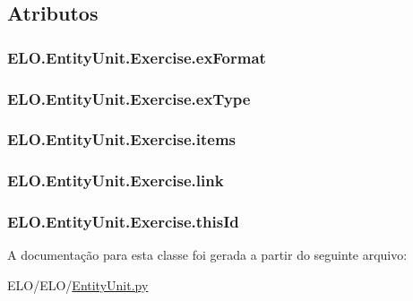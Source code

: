 \subsection{Atributos}
\hypertarget{classELO_1_1EntityUnit_1_1Exercise_a0d17db96aa0caa63df47795c50818e9f}{
\subsubsection[{ex\-Format}]{\setlength{\rightskip}{0pt plus 5cm}E\-L\-O.\-Entity\-Unit.\-Exercise.\-ex\-Format}}\label{classELO_1_1EntityUnit_1_1Exercise_a0d17db96aa0caa63df47795c50818e9f}
\hypertarget{classELO_1_1EntityUnit_1_1Exercise_af982926b59b32980803f93f40b383d77}{
\subsubsection[{ex\-Type}]{\setlength{\rightskip}{0pt plus 5cm}E\-L\-O.\-Entity\-Unit.\-Exercise.\-ex\-Type}}\label{classELO_1_1EntityUnit_1_1Exercise_af982926b59b32980803f93f40b383d77}
\hypertarget{classELO_1_1EntityUnit_1_1Exercise_a14ec766ff723672be49ea5c9438744c8}{
\subsubsection[{items}]{\setlength{\rightskip}{0pt plus 5cm}E\-L\-O.\-Entity\-Unit.\-Exercise.\-items}}\label{classELO_1_1EntityUnit_1_1Exercise_a14ec766ff723672be49ea5c9438744c8}
\hypertarget{classELO_1_1EntityUnit_1_1Exercise_a13a9382d9126f07ab380ea11df276ed8}{
\subsubsection[{link}]{\setlength{\rightskip}{0pt plus 5cm}E\-L\-O.\-Entity\-Unit.\-Exercise.\-link}}\label{classELO_1_1EntityUnit_1_1Exercise_a13a9382d9126f07ab380ea11df276ed8}
\hypertarget{classELO_1_1EntityUnit_1_1Exercise_a6277daccaa7fe96d8f0a287002cea07a}{
\subsubsection[{this\-Id}]{\setlength{\rightskip}{0pt plus 5cm}E\-L\-O.\-Entity\-Unit.\-Exercise.\-this\-Id}}\label{classELO_1_1EntityUnit_1_1Exercise_a6277daccaa7fe96d8f0a287002cea07a}


A documentação para esta classe foi gerada a partir do seguinte arquivo\-:\begin{DoxyCompactItemize}
\item 
E\-L\-O/\-E\-L\-O/\hyperlink{EntityUnit_8py}{Entity\-Unit.\-py}\end{DoxyCompactItemize}

